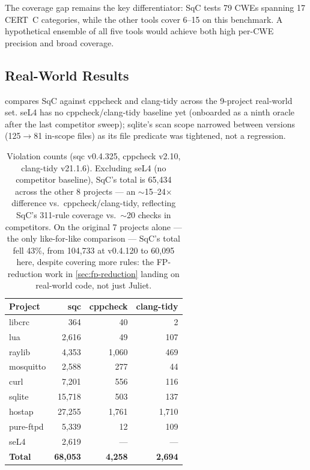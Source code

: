 The coverage gap remains the key differentiator: SqC tests 79 CWEs
spanning 17 CERT~C categories, while the other tools cover 6--15 on
this benchmark.  A hypothetical ensemble of all five tools would
achieve both high per-CWE precision and broad coverage.

\subsection{Real-World Results}
\label{sec:realworld-results}

 compares SqC against cppcheck and
clang-tidy across the 9-project real-world set. seL4 has no
cppcheck/clang-tidy baseline yet (onboarded as a ninth oracle after the
last competitor sweep); sqlite's scan scope narrowed between versions
(125$\to$81 in-scope files) as its file predicate was tightened, not a
regression.

\begin{table}[t]
\centering
\footnotesize
\begin{tabular}{@{}lrrr@{}}
\toprule
\textbf{Project} & \textbf{sqc} & \textbf{cppcheck} & \textbf{clang-tidy} \\
\midrule
libcrc & 364 & 40 & 2 \\
lua & 2,616 & 49 & 107 \\
raylib & 4,353 & 1,060 & 469 \\
mosquitto & 2,588 & 277 & 44 \\
curl & 7,201 & 556 & 116 \\
sqlite & 15,718 & 503 & 137 \\
hostap & 27,255 & 1,761 & 1,710 \\
pure-ftpd & 5,339 & 12 & 109 \\
seL4 & 2,619 & --- & --- \\
\midrule
\textbf{Total} & \textbf{68,053} & \textbf{4,258} & \textbf{2,694} \\
\bottomrule
\end{tabular}
\caption{Violation counts (sqc v0.4.325, cppcheck v2.10, clang-tidy
v21.1.6).  Excluding seL4 (no competitor baseline), SqC's total is
65,434 across the other 8 projects --- an $\sim$15--24$\times$
difference vs.\ cppcheck/clang-tidy, reflecting SqC's 311-rule coverage
vs.\ $\sim$20 checks in competitors.  On the original 7 projects alone
--- the only like-for-like comparison --- SqC's total fell 43\%, from
104,733 at v0.4.120 to 60,095 here, despite covering more rules: the
FP-reduction work in \cref{sec:fp-reduction} landing on real-world
code, not just Juliet.}
\label{tab:realworld-results}
\end{table}

